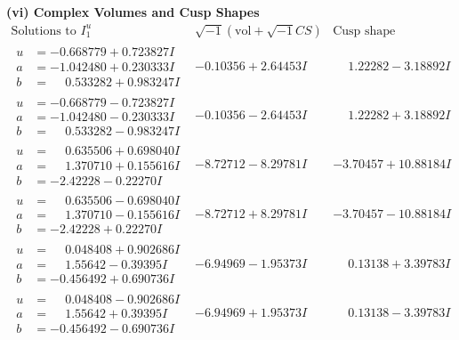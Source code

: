 \documentclass[1p]{elsarticle_modified}
\theoremstyle{definition}
\newcommand{\I}{\sqrt{-1}}
\begin{document}
\newpage\flushleft \textbf{(vi) Complex Volumes and Cusp Shapes}
$$\begin{array}{c|c|c}  
\text{Solutions to }I^u_{1}& \I (\text{vol} + \sqrt{-1}CS) & \text{Cusp shape}\\
 \hline 
\begin{aligned}
u &= -0.668779 + 0.723827 I \\
a &= -1.042480 + 0.230333 I \\
b &= \phantom{-}0.533282 + 0.983247 I\end{aligned}
 & -0.10356 + 2.64453 I & \phantom{-}1.22282 - 3.18892 I \\ \hline\begin{aligned}
u &= -0.668779 - 0.723827 I \\
a &= -1.042480 - 0.230333 I \\
b &= \phantom{-}0.533282 - 0.983247 I\end{aligned}
 & -0.10356 - 2.64453 I & \phantom{-}1.22282 + 3.18892 I \\ \hline\begin{aligned}
u &= \phantom{-}0.635506 + 0.698040 I \\
a &= \phantom{-}1.370710 + 0.155616 I \\
b &= -2.42228 - 0.22270 I\end{aligned}
 & -8.72712 - 8.29781 I & -3.70457 + 10.88184 I \\ \hline\begin{aligned}
u &= \phantom{-}0.635506 - 0.698040 I \\
a &= \phantom{-}1.370710 - 0.155616 I \\
b &= -2.42228 + 0.22270 I\end{aligned}
 & -8.72712 + 8.29781 I & -3.70457 - 10.88184 I \\ \hline\begin{aligned}
u &= \phantom{-}0.048408 + 0.902686 I \\
a &= \phantom{-}1.55642 - 0.39395 I \\
b &= -0.456492 + 0.690736 I\end{aligned}
 & -6.94969 - 1.95373 I & \phantom{-}0.13138 + 3.39783 I \\ \hline\begin{aligned}
u &= \phantom{-}0.048408 - 0.902686 I \\
a &= \phantom{-}1.55642 + 0.39395 I \\
b &= -0.456492 - 0.690736 I\end{aligned}
 & -6.94969 + 1.95373 I & \phantom{-}0.13138 - 3.39783 I \\ \hline\begin{aligned}

\end{aligned}
\end{array}$$
\end{document}
